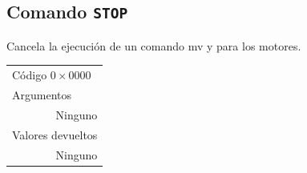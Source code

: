 \documentclass[letterpaper,10.5pt]{article}
\begin{document}
\subsection{Comando \texttt{STOP}}
Cancela la ejecución de un comando mv y para los motores.

\par\noindent
\begin{tabularx}{\linewidth}{p{1em} r c c X}
	\multicolumn{5}{X}{Código $0\times0000$}\\
	\multicolumn{5}{X}{Argumentos}\\
	&\multicolumn{4}{X}{Ninguno}\\
	\multicolumn{5}{X}{Valores devueltos}\\
	&\multicolumn{4}{X}{Ninguno}\\
\end{tabularx}
\end{document}
